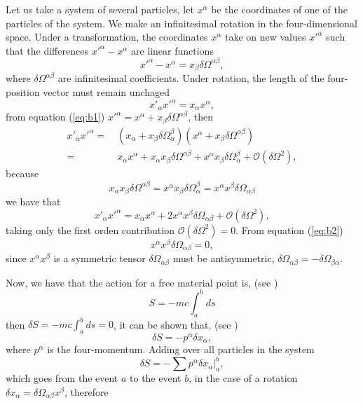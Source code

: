 \begin{appendix}
Let us take a system of several particles, let $x^{\alpha}$ be the
coordinates of one of the particles of the system. We make an infinitesimal
rotation in the four-dimensional space. Under a transformation, the
coordinates $x^{\alpha}$ take on new values $x'^{\alpha}$ such that
the differences $x'^{\alpha}-x^{\alpha}$ are linear functions
\begin{equation}
x'^{\alpha}-x^{\alpha}=x_{\beta}\delta\Omega^{\alpha\beta},\label{eq:b1}
\end{equation}
where $\delta\Omega^{\alpha\beta}$ are infinitesimal coefficients.
Under rotation, the length of the four-position vector must remain
unchaged
\begin{equation}
x'_{\alpha}x'^{\alpha}=x_{\alpha}x^{\alpha},\label{eq:b2}
\end{equation}
from equation (\ref{eq:b1}) $x'^{\alpha}=x^{\alpha}+x_{\beta}\delta\Omega^{\alpha\beta}$,
then
\begin{align*}
x'_{\alpha}x'^{\alpha}= & \ \left(x_{\alpha}+x_{\beta}\delta\Omega_{\alpha}^{\beta}\right)\left(x^{\alpha}+x_{\beta}\delta\Omega^{\alpha\beta}\right)\\
= & \ x_{\alpha}x^{\alpha}+x_{\alpha}x_{\beta}\delta\Omega^{\alpha\beta}+x^{\alpha}x_{\beta}\delta\Omega_{\alpha}^{\beta}+\mathcal{O}\left(\delta\Omega^{2}\right),
\end{align*}
because
\[
x_{\alpha}x_{\beta}\delta\Omega^{\alpha\beta}=x^{\alpha}x_{\beta}\delta\Omega_{\alpha}^{\beta}=x^{\alpha}x^{\beta}\delta\Omega_{\alpha\beta}
\]
we have that
\[
x'_{\alpha}x'^{\alpha}=x_{\alpha}x^{\alpha}+2x^{\alpha}x^{\beta}\delta\Omega_{\alpha\beta}+\mathcal{O}\left(\delta\Omega^{2}\right),
\]
taking only the first orden contribution $\mathcal{O}\left(\delta\Omega^{2}\right)=0$.
From equation (\ref{eq:b2})
\[
x^{\alpha}x^{\beta}\delta\Omega_{\alpha\beta}=0,
\]
since $x^{\alpha}x^{\beta}$ is a symmetric tensor $\delta\Omega_{\alpha\beta}$
must be antisymmetric, $\delta\Omega_{\alpha\beta}=-\delta\Omega_{\beta\alpha}$.

Now, we have that the action for a free material point is, (see \cite{LANDAU})
\[
S=-mc\int_{a}^{b}ds
\]
then $\delta S=-mc\int_{a}^{b}ds=0$, it can be shown that, (see \cite{LANDAU})
\[
\delta S=-p^{\alpha}\delta x_{\alpha},
\]
where $p^{\alpha}$ is the four-momentum. Adding over all particles
in the system
\[
\delta S=-\sum\left.p^{\alpha}\delta x_{\alpha}\right|_{a}^{b},
\]
which goes from the event $a$ to the event $b$, in the case of a
rotation $\delta x_{\alpha}=\delta\Omega_{\alpha\beta}x^{\beta}$,
therefore


\end{appendix}
